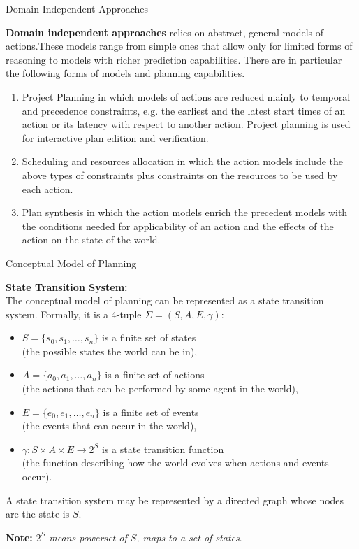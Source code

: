 \documentclass[9pt]{beamer}
\begin{document}
\begin{frame}{Domain Independent Approaches}
\begin{small}
\textbf{Domain independent approaches} relies on abstract, general models of actions.These models range from simple ones that allow only for limited forms of reasoning to models with richer prediction capabilities. There are in particular the following forms of models and planning capabilities.

\begin{enumerate}
\item Project Planning in which models of actions are reduced mainly to temporal and precedence constraints, e.g. the earliest and the latest start times of an action or its latency with respect to another action. Project planning is used for interactive plan edition and verification.
\item Scheduling and resources allocation in which the action models include the above types of constraints plus constraints on the resources to be used by each action.
\item Plan synthesis in which the action models enrich the precedent models with the conditions needed for applicability of an action and the effects of the action on the state of the world.
\end{enumerate}
\end{small}
\end{frame}

\begin{frame}{Conceptual Model of Planning}
\begin{small}

\textbf{State Transition System:}\\
The conceptual model of planning can be represented as a state transition system. Formally, it is a 4-tuple $\Sigma=(S,A,E,\gamma)$:

\begin{itemize}
\item $S=\{s_0, s_1, \dots, s_n\}$ is a finite set of states\\(the possible states the world can be in),
\item $A= \{a_0, a_1, \dots, a_n\}$ is a finite set of actions\\(the actions that can be performed by some agent in the world),
\item $E=\{e_0, e_1, \dots, e_n\}$ is a finite set of events\\(the events that can occur in the world),
\item $\gamma: S \times A \times E \rightarrow 2^S$ is a state transition function\\(the function describing how the world evolves when actions and events occur).
\end{itemize}

A state transition system may be represented by a directed graph whose nodes are the state is $S$.

\textbf{Note:} \emph{$2^S$ means powerset of $S$, maps to a set of states}.

\end{small}
\end{frame}
\end{document}

